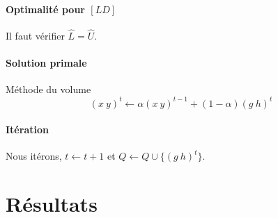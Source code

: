 \documentclass[12pt,a4paper]{article}
\begin{document}
 \paragraph{Optimalité pour $[LD]$} Il faut vérifier $\hat{L} = \hat{U}$.
 
 \paragraph{Solution primale} Méthode du volume
 $$(x~y)^t \leftarrow \alpha (x~y)^{t-1} + (1- \alpha)(g~h)^t$$
 
 \paragraph{Itération}Nous itérons, $t \leftarrow t+1$ et $Q \leftarrow Q \cup  \{(g~h)^t\}$.
 
 
 \section*{Résultats}
 
 
\end{document}
